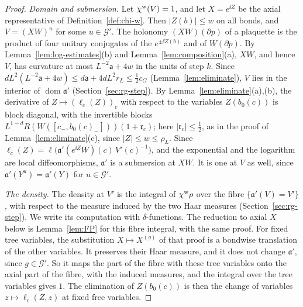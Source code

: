 \begin{proof}
\emph{Domain and submersion.} Let $\chi^{\rm w}(V)=1$, and let $X=e^{\ii Z}$ be the axial representative of Definition~\ref{def:chi-w}. Then $|Z(b)|\le w$ on all bonds, and $V=(XW)^u$ for some $u\in\mathcal G'$. The holonomy $(XW)(\partial p)$ of a plaquette is the product of four unitary conjugates of the $e^{\pm\ii Z(b)}$ and of $W(\partial p)$. By Lemma~\ref{lem:log-estimates}(b) and Lemma~\ref{lem:composition}(a), $XW$, and hence $V$, has curvature at most $L^{-2}\mathsf a+4w$ in the units of step $k$. Since $dL^2(L^{-2}\mathsf a+4w)\le d\mathsf a+4dL^2r_L\le\frac12c_G$ (Lemma~\ref{lem:eliminate}), $V$ lies in the interior of $\operatorname{dom}\mathfrak a'$ (Section~\ref{sec:rg-step}). By Lemma~\ref{lem:eliminate}(a),(b), the derivative of $Z\mapsto(\ell_c(Z))_c$ with respect to the variables $Z(b_0(c))$ is block diagonal, with the invertible blocks $L^{1-d}R(W([c_-,b_0(c)_-]))(1+\mathfrak r_c)$; here $|\mathfrak r_c|\le\frac12$, as in the proof of Lemma~\ref{lem:eliminate}(c), since $|Z|\le w\le\rho_L$. Since $\ell_c(Z)=\ell\big(\mathfrak a'(e^{\ii Z}W)(c)\,V'(c)^{-1}\big)$, and the exponential and the logarithm are local diffeomorphisms, $\mathfrak a'$ is a submersion at $XW$. It is one at $V$ as well, since $\mathfrak a'(Y^u)=\mathfrak a'(Y)$ for $u\in\mathcal G'$.

\emph{The density.} The density at $V'$ is the integral of $\chi^{\rm w}\rho$ over the fibre $\{\mathfrak a'(V)=V'\}$, with respect to the measure induced by the two Haar measures (Section~\ref{sec:rg-step}). We write its computation with $\delta$-functions. The reduction to axial $X$ below is Lemma~\ref{lem:FP} for this fibre integral, with the same proof. For fixed tree variables, the substitution $X\mapsto X^{(g)}$ of that proof is a bondwise translation of the other variables. It preserves their Haar measure, and it does not change $\mathfrak a'$, since $g\in\mathcal G'$. So it maps the part of the fibre with these tree variables onto the axial part of the fibre, with the induced measures, and the integral over the tree variables gives $1$. The elimination of $Z(b_0(c))$ is then the change of variables $z\mapsto\ell_c(Z,z)$ at fixed free variables.


\end{proof}
